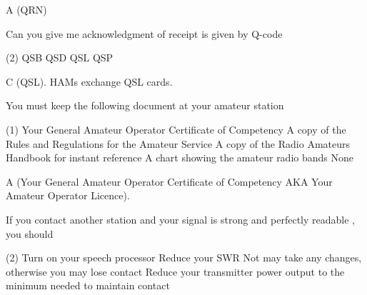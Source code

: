 \documentclass[a4paper]{article}
\begin{document}
\begin{solution}
	A (QRN)
\end{solution}

\vspace{5mm}



\begin{question}\apostrophe{}Can you give me acknowledgment of receipt\apostrophe{} is given by Q-code
	\begin{tasks}(2)
		\task QSB
		\task QSD
		\task QSL
		\task QSP
	\end{tasks}
\end{question}

\begin{solution}
	C (QSL). HAMs exchange QSL cards.
\end{solution}

\vspace{5mm}




\begin{question}You must keep the following document at your amateur station
	\begin{tasks}(1)
		\task Your General Amateur Operator Certificate of Competency
		\task A copy of the Rules and Regulations for the Amateur Service
		\task A copy of the Radio Amateurs Handbook for instant reference
		\task A chart showing the amateur radio bands
		\task None
	\end{tasks}
\end{question}

\begin{solution}
	A (Your General Amateur Operator Certificate of Competency AKA Your Amateur Operator Licence).
\end{solution}

\vspace{5mm}



\begin{question}If you contact another station and your signal is strong and perfectly readable , you should
	\begin{tasks}(2)
		\task Turn on your speech processor
		\task Reduce your SWR
		\task Not may take any changes, otherwise you may lose contact
		\task Reduce your transmitter power output to the minimum needed to maintain contact
	\end{tasks}
\end{question}
\end{document}
